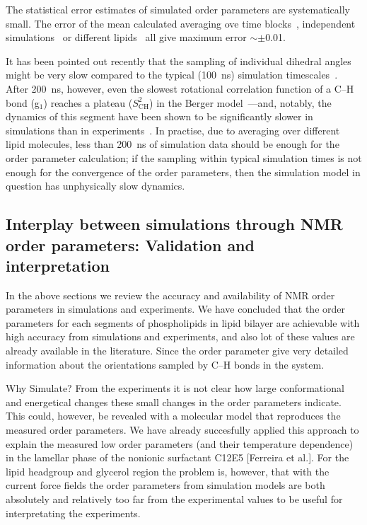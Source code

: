 \documentclass[aps,prl,superscriptaddress,twocolumn]{revtex4}
\begin{document}
The statistical error estimates of simulated order parameters are systematically
small. The error of the mean calculated averaging ove time blocks~\cite{ollila07}, independent 
simulations~\cite{poger12} or different lipids~\cite{botain15} all give maximum error $\sim \pm$0.01.

It has been pointed out recently that the sampling of individual dihedral angles might be very
slow compared to the typical (100~ns) simulation timescales~\cite{vogel12}.
After 200~ns, however, even the slowest rotational correlation function of a C--H bond  (g$_1$) reaches
a plateau ($S_\mathrm{CH}^2$) in the Berger model~\cite{berger97}---and, notably,
the dynamics of this segment have been shown to be significantly slower in simulations
than in experiments~\cite{ferreira15}.
In practise,
due to averaging over different lipid molecules,
less than 200~ns of simulation data should be enough for the order parameter calculation;
if the sampling within typical simulation times
is not enough for the convergence of the order parameters,
then the simulation model in question has unphysically slow dynamics.



\subsection{Interplay between simulations through NMR order parameters: Validation and interpretation}

In the above sections we review the accuracy and availability of NMR order parameters in simulations and experiments.
We have concluded that the order parameters for each segments of phospholipids in lipid bilayer are achievable
with high accuracy from simulations and experiments, and also lot of these values are already available 
in the literature. Since the order parameter give very detailed information about the orientations
sampled by C--H bonds in the system.

Why Simulate?
From the experiments it is not clear how large conformational and energetical changes these small changes in the order parameters indicate. This could, however, be revealed with a molecular model that reproduces the measured order parameters. We have already succesfully applied this approach to explain the measured low order parameters (and their temperature dependence) in the lamellar phase of the nonionic surfactant C12E5 [Ferreira et al.]. For the lipid headgroup and glycerol region the problem is, however, that with the current force fields the order parameters from simulation models are both absolutely and relatively too far from the experimental values to be useful for interpretating the experiments. 
\end{document}
